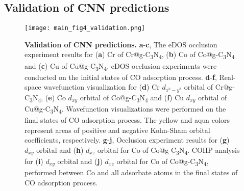 
\subsection{Validation of CNN predictions}

\begin{figure}[htbp]
    \centering
    \texttt{[image: main\_fig4\_validation.png]}
    \caption{\textbf{Validation of CNN predictions.}
    \textbf{a}-\textbf{c}, The eDOS occlusion experiment results for
    (\textbf{a}) Cr of Cr@g-C\textsubscript{3}N\textsubscript{4},
    (\textbf{b}) Co of Co@g-C\textsubscript{3}N\textsubscript{4} and
    (\textbf{c}) Cu of Cu@g-C\textsubscript{3}N\textsubscript{4}.
    eDOS occlusion experiments were conducted on the initial states of CO adsorption process.
    \textbf{d}-\textbf{f}, Real-space wavefunction visualization for
    (\textbf{d}) Cr $d_{x^2-y^2}$ orbital of Cr@g-C\textsubscript{3}N\textsubscript{4},
    (\textbf{e}) Co $d_{xy}$ orbital of Co@g-C\textsubscript{3}N\textsubscript{4} and
    (\textbf{f}) Cu $d_{xy}$ orbital of Cu@g-C\textsubscript{3}N\textsubscript{4}.
    Wavefunction visualizations were performed on the final states of CO adsorption process.
    The yellow and aqua colors represent areas of positive and negative
    Kohn-Sham orbital coefficients, respectively.
    \textbf{g}-\textbf{j}, Occlusion experiment results for (\textbf{g}) $d_{xy}$ orbital
    and (\textbf{h}) $d_{xz}$ orbital for Co of Co@g-C\textsubscript{3}N\textsubscript{4}.
    COHP analysis for (\textbf{i}) $d_{xy}$ orbital and (\textbf{j}) $d_{xz}$ orbital for
    Co of Co@g-C\textsubscript{3}N\textsubscript{4}, performed between Co and
    all adsorbate atoms in the final states of CO adsorption process.}
    \label{main_fig4:validation}
\end{figure}


